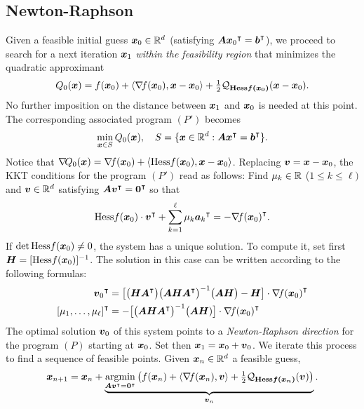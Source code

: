 \subsection{Newton-Raphson}
Given a feasible initial guess $\boldsymbol{x}_0 \in \mathbb{R}^d$ (satisfying $\boldsymbol{A}{\boldsymbol{x}_0}^\intercal={\boldsymbol{b}}^\intercal$), we proceed to search for a next iteration $\boldsymbol{x}_1$ \emph{within the feasibility region} that minimizes the quadratic approximant  
\begin{equation*}
Q_0(\boldsymbol{x}) = f(\boldsymbol{x}_0) + \langle \mathop{\nabla\! {f}}(\boldsymbol{x}_0), \boldsymbol{x}-\boldsymbol{x}_0 \rangle + \tfrac{1}{2} \mathcal{Q}_{\boldsymbol{\mathop{\mathrm{Hess}{f}}(\boldsymbol{x}_0)}}(\boldsymbol{x}-\boldsymbol{x}_0).
\end{equation*}   
No further imposition on the distance between $\boldsymbol{x}_1$ and $\boldsymbol{x}_0$ is needed at this point.  The corresponding associated program $(P')$ becomes
\begin{equation*}
\min_{\boldsymbol{x}\in S} Q_0(\boldsymbol{x}), \quad S = \{ \boldsymbol{x} \in \mathbb{R}^d: \boldsymbol{A}{\boldsymbol{x}}^\intercal = {\boldsymbol{b}}^\intercal \}.
\end{equation*}
Notice that $\mathop{\nabla\! {Q_0}}(\boldsymbol{x}) = \mathop{\nabla\! {f}}(\boldsymbol{x}_0) + \langle \mathop{\mathrm{Hess}{f}}(\boldsymbol{x}_0), \boldsymbol{x}- \boldsymbol{x}_0 \rangle$.  Replacing $\boldsymbol{v} = \boldsymbol{x} -\boldsymbol{x}_0$, the KKT conditions for the program $(P')$ read as follows: Find $\mu_k \in \mathbb{R}$ ($1\leq k \leq \ell)$ and $\boldsymbol{v} \in \mathbb{R}^d$ satisfying $\boldsymbol{A} {\boldsymbol{v}}^\intercal = {\boldsymbol{0}}^\intercal$ so that 
\begin{equation*}
\mathop{\mathrm{Hess}{f}}(\boldsymbol{x}_0) \cdot {\boldsymbol{v}}^\intercal + \sum_{k=1}^\ell \mu_k {\boldsymbol{a}_k}^\intercal = -{\mathop{\nabla\! {f}}(\boldsymbol{x}_0)}^\intercal.
\end{equation*}
If $\det\mathop{\mathrm{Hess}{f}}(\boldsymbol{x}_0) \neq 0$, the system has a unique solution.  To compute it, set first $\boldsymbol{H} = [\mathop{\mathrm{Hess}{f}}(\boldsymbol{x}_0)]^{-1}$.  The solution in this case can be written according to the following formulas:
\begin{equation}\label{equation:projMethodsNewton}
\begin{split}
{\boldsymbol{v}_0}^\intercal &= \big[ \big( \boldsymbol{H} {\boldsymbol{A}}^\intercal \big) \big( \boldsymbol{A} \boldsymbol{H} {\boldsymbol{A}}^\intercal \big)^{-1} \big( \boldsymbol{A} \boldsymbol{H} \big) - \boldsymbol{H} \big] \cdot {\mathop{\nabla\! {f}}(\boldsymbol{x}_0)}^\intercal \\
{[ \mu_1, \dotsc, \mu_\ell ]}^\intercal &= - \big[ \big( \boldsymbol{A} \boldsymbol{H} {\boldsymbol{A}}^\intercal \big)^{-1} \big( \boldsymbol{A} \boldsymbol{H}) \big] \cdot {\mathop{\nabla\! {f}}(\boldsymbol{x}_0)}^\intercal
\end{split}
\end{equation}
The optimal solution $\boldsymbol{v}_0$ of this system points to a \emph{Newton-Raphson direction} for the program $(P)$ starting at $\boldsymbol{x}_0$.  Set then $\boldsymbol{x}_1 = \boldsymbol{x}_0 + \boldsymbol{v}_0$.  We iterate this process to find a sequence of feasible points.  Given $\boldsymbol{x}_n \in \mathbb{R}^d$ a feasible guess,
\begin{equation*}
\boldsymbol{x}_{n+1} = \boldsymbol{x}_n + \underbrace{\operatorname*{argmin}_{\boldsymbol{A}{\boldsymbol{v}}^\intercal = {\boldsymbol{0}}^\intercal } \big( f(\boldsymbol{x}_n) + \langle \mathop{\nabla\! {f}}(\boldsymbol{x}_n), \boldsymbol{v} \rangle + \tfrac{1}{2} \mathcal{Q}_{\boldsymbol{\mathop{\mathrm{Hess}{f}}(\boldsymbol{x}_n)}}(\boldsymbol{v}) \big) }_{\boldsymbol{v}_n}.
\end{equation*}

